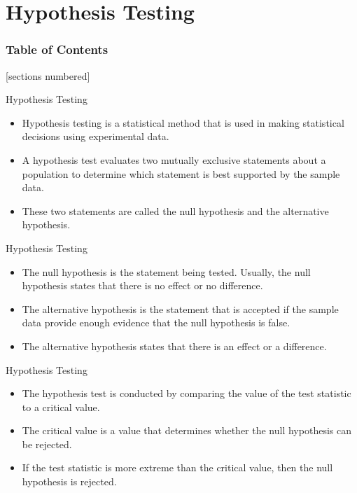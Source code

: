 \documentclass[serif, 9pt, aspectratio=32]{beamer}
\begin{document}
\section{Hypothesis Testing}

\begin{frame}
    \frametitle{Table of Contents}
    [sections numbered]
    \tableofcontents[currentsection]
\end{frame}

\begin{frame}{Hypothesis Testing}
    \begin{itemize}
        \item Hypothesis testing is a statistical method that is used in making statistical decisions using experimental data.
        \item A hypothesis test evaluates two mutually exclusive statements about a population to determine which statement is best supported by the sample data.
        \item These two statements are called the null hypothesis and the alternative hypothesis.
    \end{itemize}
\end{frame}

\begin{frame}{Hypothesis Testing}
    \begin{itemize}
        \setlength{\itemsep}{2em}
        \item The null hypothesis is the statement being tested. Usually, the null hypothesis states that there is no effect or no difference.
        \item The alternative hypothesis is the statement that is accepted if the sample data provide enough evidence that the null hypothesis is false.
        \item The alternative hypothesis states that there is an effect or a difference.
    \end{itemize}
\end{frame}

\begin{frame}{Hypothesis Testing}
    \begin{itemize}
        \setlength{\itemsep}{2em}
        \item The hypothesis test is conducted by comparing the value of the test statistic to a critical value.
        \item The critical value is a value that determines whether the null hypothesis can be rejected.
        \item If the test statistic is more extreme than the critical value, then the null hypothesis is rejected.
    \end{itemize}
\end{frame}
\end{document}
